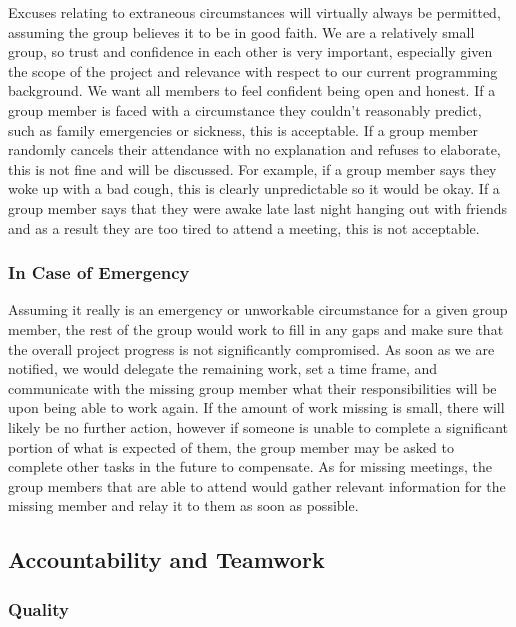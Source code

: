 \documentclass{article}
\begin{document}
Excuses relating to extraneous circumstances will virtually always be permitted, assuming the group believes it to be in good faith. We are a relatively small group, so trust and confidence in each other is very important, especially given the scope of the project and relevance with respect to our current programming background. We want all members to feel confident being open and honest. If a group member is faced with a circumstance they couldn't reasonably predict, such as family emergencies or sickness, this is acceptable. If a group member randomly cancels their attendance with no explanation and refuses to elaborate, this is not fine and will be discussed. For example, if a group member says they woke up with a bad cough, this is clearly unpredictable so it would be okay. If a group member says that they were awake late last night hanging out with friends and as a result they are too tired to attend a meeting, this is not acceptable. 

\subsubsection*{In Case of Emergency}

Assuming it really is an emergency or unworkable circumstance for a given group member, the rest of the group would work to fill in any gaps and make sure that the overall project progress is not significantly compromised. As soon as we are notified, we would delegate the remaining work, set a time frame, and communicate with the missing group member what their responsibilities will be upon being able to work again. If the amount of work missing is small, there will likely be no further action, however if someone is unable to complete a significant portion of what is expected of them, the group member may be asked to complete other tasks in the future to compensate. As for missing meetings, the group members that are able to attend would gather relevant information for the missing member and relay it to them as soon as possible. 

\subsection*{Accountability and Teamwork}

\subsubsection*{Quality} 
\end{document}
